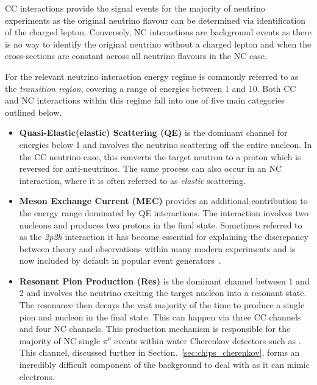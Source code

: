 CC interactions provide the signal events for the majority of neutrino experiments as the original
neutrino flavour can be determined via identification of the charged lepton. Conversely, NC
interactions are background events as there is no way to identify the original neutrino without a
charged lepton and when the cross-sections are constant across all neutrino flavours in the NC
case.

For \chips the relevant neutrino interaction energy regime is commonly referred to as the
\emph{transition region}, covering a range of energies between 1 and \unit{10}{\GeV}. Both CC and
NC interactions within this regime fall into one of five main categories outlined below.

\begin{itemize}
    \item \textbf{Quasi-Elastic(elastic) Scattering (QE)} is the dominant channel for energies
          below \unit{1}{\GeV} and involves the neutrino scattering off the entire nucleon. In the
          CC neutrino case, this converts the target neutron to a proton which is reversed for
          anti-neutrinos. The same process can also occur in an NC interaction, where it is often
          referred to as \emph{elastic} scattering.

    \item \textbf{Meson Exchange Current (MEC)} provides an additional contribution to the energy
          range dominated by QE interactions. The interaction involves two nucleons and produces
          two protons in the final state. Sometimes referred to as the \emph{2p2h} interaction it
          has become essential for explaining the discrepancy between theory and observations
          within many modern experiments and is now included by default in popular event
          generators~\cite{katori2013}.

    \item \textbf{Resonant Pion Production (Res)} is the dominant channel between 1 and
          \unit{2}{\GeV} and involves the neutrino exciting the target nucleon into a resonant
          state. The resonance then decays the vast majority of the time to produce a single pion
          and nucleon in the final state. This can happen via three CC channels and four NC
          channels. This production mechanism is responsible for the majority of NC single
          $\pi^{0}$ events within water Cherenkov detectors such as \chips. This channel,
          discussed further in Section.~\ref{sec:chips_cherenkov}, forms an incredibly difficult
          component of the background to deal with as it can mimic electrons.


\end{itemize}
